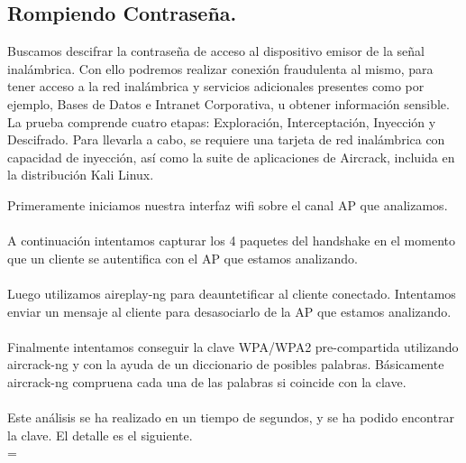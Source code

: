 \subsection{Rompiendo Contraseña.}

Buscamos descifrar la contraseña de acceso al dispositivo emisor de la señal inalámbrica. Con ello podremos realizar conexión fraudulenta al mismo, para tener acceso a la red inalámbrica y servicios adicionales presentes como por ejemplo, Bases de Datos e Intranet Corporativa, u obtener información sensible. La prueba comprende cuatro etapas: Exploración, Interceptación, Inyección y Descifrado. Para llevarla a cabo, se requiere una tarjeta de red inalámbrica con capacidad de inyección, así como la suite de aplicaciones de Aircrack, incluida en la distribución Kali Linux.

Primeramente iniciamos nuestra interfaz wifi sobre el canal AP que analizamos.\\

\textbf{}\\

A continuación intentamos capturar los 4 paquetes del handshake en el momento que un cliente se autentifica con el AP que estamos analizando.\\

\textbf{}\\

Luego utilizamos aireplay-ng para deauntetificar al cliente conectado. Intentamos enviar un mensaje al cliente para desasociarlo de la AP que estamos analizando.\\

\textbf{}\\

Finalmente intentamos conseguir la clave WPA/WPA2 pre-compartida utilizando aircrack-ng y con la ayuda de un diccionario de posibles palabras. Básicamente aircrack-ng compruena cada una de las palabras si coincide con la clave.\\

\textbf{}\\

Este análisis se ha realizado en un tiempo de \textbf{} segundos, y \textbf{} se ha podido encontrar la clave. El detalle es el siguiente.\\

\begingroup
        \fontsize{7pt}{7pt}=\selectfont
        }
\endgroup

